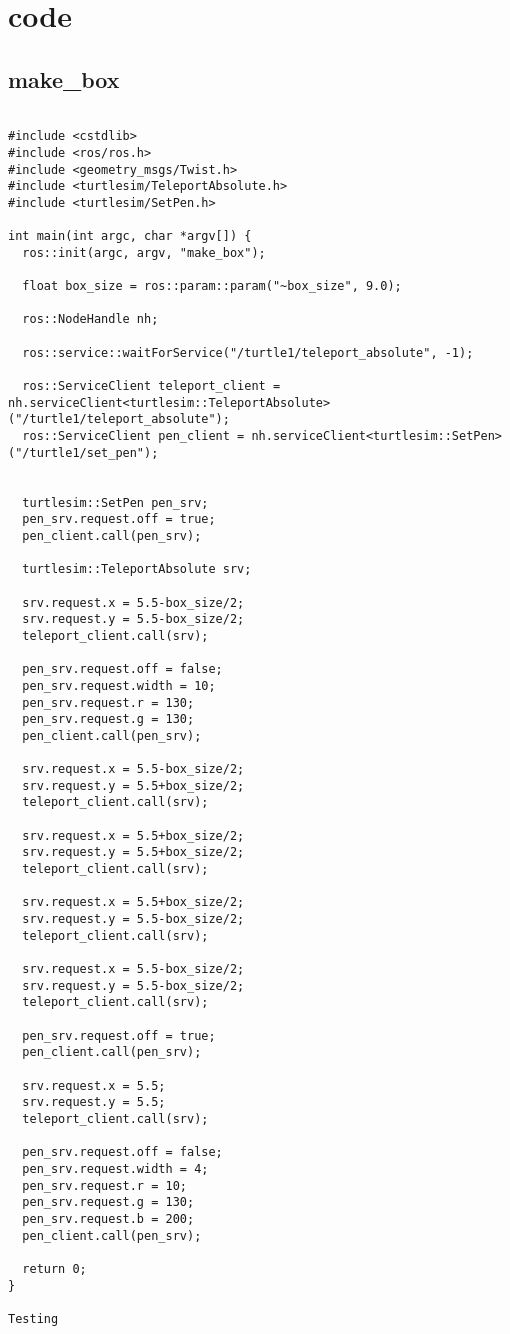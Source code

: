 \chapter{code}

\section{make\_box}

\begin{lstlisting}

#include <cstdlib>
#include <ros/ros.h>
#include <geometry_msgs/Twist.h>
#include <turtlesim/TeleportAbsolute.h>
#include <turtlesim/SetPen.h>

int main(int argc, char *argv[]) {
  ros::init(argc, argv, "make_box");

  float box_size = ros::param::param("~box_size", 9.0);

  ros::NodeHandle nh;

  ros::service::waitForService("/turtle1/teleport_absolute", -1);

  ros::ServiceClient teleport_client = nh.serviceClient<turtlesim::TeleportAbsolute>("/turtle1/teleport_absolute");
  ros::ServiceClient pen_client = nh.serviceClient<turtlesim::SetPen>("/turtle1/set_pen");


  turtlesim::SetPen pen_srv;
  pen_srv.request.off = true;
  pen_client.call(pen_srv);

  turtlesim::TeleportAbsolute srv;

  srv.request.x = 5.5-box_size/2;
  srv.request.y = 5.5-box_size/2;
  teleport_client.call(srv);

  pen_srv.request.off = false;
  pen_srv.request.width = 10;
  pen_srv.request.r = 130;
  pen_srv.request.g = 130;
  pen_client.call(pen_srv);

  srv.request.x = 5.5-box_size/2;
  srv.request.y = 5.5+box_size/2;
  teleport_client.call(srv);

  srv.request.x = 5.5+box_size/2;
  srv.request.y = 5.5+box_size/2;
  teleport_client.call(srv);

  srv.request.x = 5.5+box_size/2;
  srv.request.y = 5.5-box_size/2;
  teleport_client.call(srv);

  srv.request.x = 5.5-box_size/2;
  srv.request.y = 5.5-box_size/2;
  teleport_client.call(srv);

  pen_srv.request.off = true;
  pen_client.call(pen_srv);

  srv.request.x = 5.5;
  srv.request.y = 5.5;
  teleport_client.call(srv);

  pen_srv.request.off = false;
  pen_srv.request.width = 4;
  pen_srv.request.r = 10;
  pen_srv.request.g = 130;
  pen_srv.request.b = 200;
  pen_client.call(pen_srv);

  return 0;
}

Testing
\end{lstlisting}